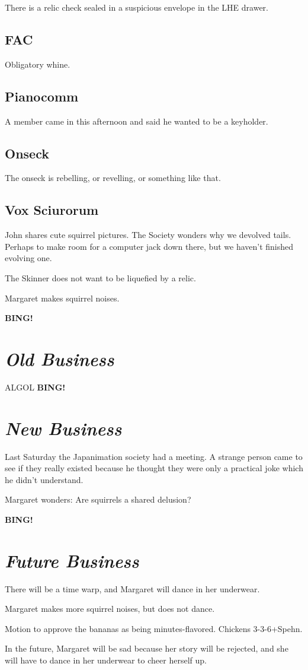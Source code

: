 \documentclass[10pt]{article}
\newcommand{\bing}{{\bf BING!} }
\newcommand{\goto}[1]{\bing \vskip 12pt \section*{{\em{#1}}}}
\begin{document}
There is a relic check sealed in a suspicious envelope in the
LHE drawer.

\subsection*{FAC}

Obligatory whine.

\subsection*{Pianocomm}

A member came in this afternoon and said he wanted to be a keyholder.

\subsection*{Onseck}

The onseck is rebelling, or revelling, or something like that.

\subsection*{Vox Sciurorum}

John shares cute squirrel pictures.  The Society wonders
why we devolved tails.  Perhaps to make room for a computer
jack down there, but we haven't finished evolving one.

The Skinner does not want to be liquefied by a relic.

Margaret makes squirrel noises.

\goto{Old Business}

ALGOL
\goto{New Business}

Last Saturday the Japanimation society had a meeting.
A strange person came to see if they really existed
because he thought they were only a practical joke
which he didn't understand.

Margaret wonders: Are squirrels a shared delusion?

\goto{Future Business}

There will be a time warp, and Margaret will dance in her underwear.

Margaret makes more squirrel noises, but does not dance.

Motion to approve the bananas as being minutes-flavored.
Chickens \hbox{3-3-6+Spehn}.

In the future, Margaret will be sad because her story will
be rejected, and she will have to dance in her underwear
to cheer herself up.
\end{document}

